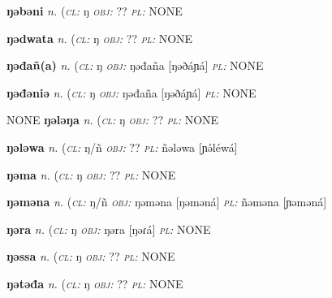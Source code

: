 {\newentry
\headword\textbf{ŋəbəni}  
\ipa{[ŋə́bə́ní}
\synpos\textit{n.} 
\class(\textit{\textsc{cl:}} {ŋ}
\object\textit{\textsc{obj:}} ??
\plural\textit{\textsc{pl:}} NONE

\newentry
\headword\textbf{ŋədwata}  
\ipa{[ŋədwata}
\synpos\textit{n.} 
\class(\textit{\textsc{cl:}} {ŋ}
\object\textit{\textsc{obj:}} ??
\plural\textit{\textsc{pl:}} NONE


\newentry
\headword\textbf{ŋəđañ(a)}  
\ipa{[ŋəðáɲ(á)]}
\synpos\textit{n.} 
\class(\textit{\textsc{cl:}} {ŋ}
\object\textit{\textsc{obj:}} ŋəđaña [ŋəðáɲá]
\plural\textit{\textsc{pl:}} NONE

\newentry
\headword\textbf{ŋəđəniə}  
\ipa{[ŋəðəniə]}
\synpos\textit{n.} 
\class(\textit{\textsc{cl:}} {ŋ}
\object\textit{\textsc{obj:}} ŋəđaña [ŋəðáɲá]
\plural\textit{\textsc{pl:}} NONE

	NONE	
\newentry
\headword\textbf{ŋələŋa}  
\ipa{[ŋələŋa]}
\synpos\textit{n.} 
\class(\textit{\textsc{cl:}} {ŋ}
\object\textit{\textsc{obj:}} ??
\plural\textit{\textsc{pl:}} NONE

\newentry
\headword\textbf{ŋələwa}  
\ipa{[ŋə́léwá]}
\synpos\textit{n.} 
\class(\textit{\textsc{cl:}} {ŋ/ñ}
\object\textit{\textsc{obj:}} ??
\plural\textit{\textsc{pl:}} ñələwa [ɲə́léwá]

\newentry
\headword\textbf{ŋəma}  
\ipa{[ŋəma]}
\synpos\textit{n.} 
\class(\textit{\textsc{cl:}} {ŋ}
\object\textit{\textsc{obj:}} ??
\plural\textit{\textsc{pl:}} NONE


\newentry
\headword\textbf{ŋəməna}  
\ipa{[ŋəməná]}
\synpos\textit{n.} 
\class(\textit{\textsc{cl:}} {ŋ/ñ}
\object\textit{\textsc{obj:}} ŋəməna [ŋəməná]
\plural\textit{\textsc{pl:}} ñəməna [ɲəməná]

\newentry
\headword\textbf{ŋəra}  
\ipa{[ŋəɾá]}
\synpos\textit{n.} 
\class(\textit{\textsc{cl:}} {ŋ}
\object\textit{\textsc{obj:}} ŋəra [ŋəɾá]
\plural\textit{\textsc{pl:}} NONE

\newentry
\headword\textbf{ŋəssa}  
\ipa{[ŋə́sːa]}
\synpos\textit{n.} 
\class(\textit{\textsc{cl:}} {ŋ}
\object\textit{\textsc{obj:}} ??
\plural\textit{\textsc{pl:}} NONE

\newentry
\headword\textbf{ŋətəđa}  
\ipa{[ŋətəða]}
\synpos\textit{n.} 
\class(\textit{\textsc{cl:}} {ŋ}
\object\textit{\textsc{obj:}} ??
\plural\textit{\textsc{pl:}} NONE

}
